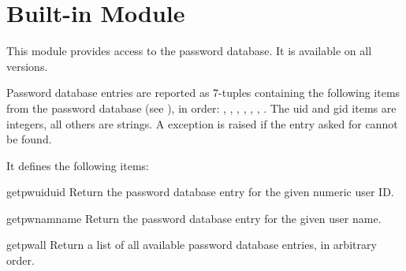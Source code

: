 \section{Built-in Module }
\label{module-pwd}

This module provides access to the \UNIX{} password database.
It is available on all \UNIX{} versions.

Password database entries are reported as 7-tuples containing the
following items from the password database (see ), in order:
,
,
,
,
,
,
.
The uid and gid items are integers, all others are strings.
A  exception is raised if the entry asked for cannot be found.

It defines the following items:

\renewcommand{\indexsubitem}{(in module pwd)}
\begin{funcdesc}{getpwuid}{uid}
Return the password database entry for the given numeric user ID.
\end{funcdesc}

\begin{funcdesc}{getpwnam}{name}
Return the password database entry for the given user name.
\end{funcdesc}

\begin{funcdesc}{getpwall}{}
Return a list of all available password database entries, in arbitrary order.
\end{funcdesc}
